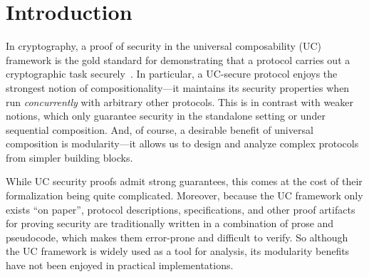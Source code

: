\section{Introduction}
\label{sec:introduction}

In cryptography, a proof of security in the universal composability (UC)
framework is the gold standard for demonstrating that a protocol carries out a
cryptographic task securely~\cite{canetti2001universally}. In particular, a
UC-secure protocol enjoys the strongest notion of compositionality---it maintains
its security properties when run \emph{concurrently} with arbitrary other
protocols. This is in contrast with weaker notions, which only guarantee
security in the standalone setting or under sequential composition. And, of
course, a desirable benefit of universal composition is modularity---it allows us
to design and analyze complex protocols from simpler building blocks.

\begin{comment}
In a nutshell, security proofs in UC follow the real/ideal
paradigm~\cite{goldreich1987play}. The security requirements of a given task are
defined as a program for a \emph{single trusted process} called an \emph{ideal
  functionality}, which runs in an imagined ideal world. This serves as a
specification of the desired security properties for a distributed protocol
achieving the task across \emph{many unstrusted processes}, which runs in the
real world. Roughly speaking, we say that a protocol $\pi$ \emph{emulates} an
ideal functionality $\mc{F}$ (i.e., it meets its specification) if every
adversarial behavior in the real world can also be exhibited in the ideal world.
\end{comment}

While UC security proofs admit strong guarantees, this comes at the cost of
their formalization being quite complicated. Moreover, because the UC framework
only exists ``on paper'', protocol descriptions, specifications, and other proof
artifacts for proving security are traditionally written in a combination of
prose and pseudocode, which makes them error-prone and difficult to
verify.  So although the UC framework is widely
used as a tool for analysis, its modularity benefits have not been enjoyed in
practical implementations.


